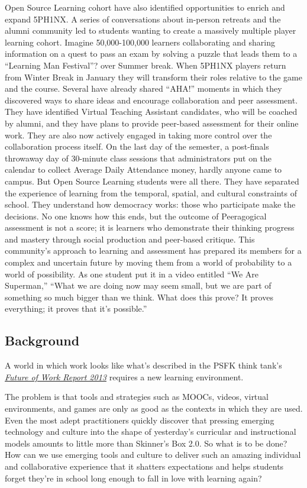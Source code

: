 Open Source Learning cohort have also identified opportunities to enrich
and expand 5PH1NX. A series of conversations about in-person retreats
and the alumni community led to students wanting to create a massively
multiple player learning cohort. Imagine 50,000-100,000 learners
collaborating and sharing information on a quest to pass an exam by
solving a puzzle that leads them to a ``Learning Man Festival''? over
Summer break. When 5PH1NX players return from Winter Break in January
they will transform their roles relative to the game and the course.
Several have already shared ``AHA!'' moments in which they discovered
ways to share ideas and encourage collaboration and peer assessment.
They have identified Virtual Teaching Assistant candidates, who will be
coached by alumni, and they have plans to provide peer-based assessment
for their online work. They are also now actively engaged in taking more
control over the collaboration process itself. On the last day of the
semester, a post-finals throwaway day of 30-minute class sessions that
administrators put on the calendar to collect Average Daily Attendance
money, hardly anyone came to campus. But Open Source Learning students
were all there. They have separated the experience of learning from the
temporal, spatial, and cultural constraints of school. They understand
how democracy works: those who participate make the decisions. No one
knows how this ends, but the outcome of Peeragogical assessment is not a
score; it is learners who demonstrate their thinking progress and
mastery through social production and peer-based critique. This
community's approach to learning and assessment has prepared its members
for a complex and uncertain future by moving them from a world of
probability to a world of possibility. As one student put it in a video
entitled ``We Are Superman,'' ``What we are doing now may seem small,
but we are part of something so much bigger than we think. What does
this prove? It proves everything; it proves that it's possible.''

\subsection{Background}\label{background}

A world in which work looks like what's described in the PSFK think
tank's
\emph{\href{http://www.slideshare.net/PSFK/psfk-presents-future-of-work-report}{Future
of Work Report 2013}} requires a new learning environment.

The problem is that tools and strategies such as MOOCs, videos, virtual
environments, and games are only as good as the contexts in which they
are used. Even the most adept practitioners quickly discover that
pressing emerging technology and culture into the shape of yesterday's
curricular and instructional models amounts to little more than
Skinner's Box 2.0. So what is to be done? How can we use emerging tools
and culture to deliver such an amazing individual and collaborative
experience that it shatters expectations and helps students forget
they're in school long enough to fall in love with learning again?

